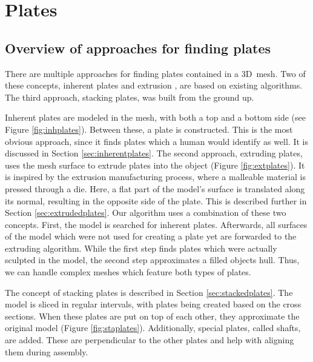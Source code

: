 \documentclass[../ClassicThesis.tex]{subfiles}
\begin{document}
\chapter{Plates}\label{ch:plates}

\section{Overview of approaches for finding plates}

There are multiple approaches for finding plates contained in a 3D~mesh. Two of these concepts, inherent plates \cite[p.~32]{master-thesis} and extrusion \cite[p.~28]{master-thesis}, are based on existing algorithms. The third approach, stacking plates, was built from the ground up.

Inherent plates are modeled in the mesh, with both a top and a bottom side (see Figure \ref{fig:inhplates}). Between these, a plate is constructed. This is the most obvious approach, since it finds plates which a human would identify as well. It is discussed in Section \ref{sec:inherentplates}. The second approach, extruding plates, uses the mesh surface to extrude plates into the object (Figure \ref{fig:extplates}). It is inspired by the extrusion manufacturing process, where a malleable material is pressed through a die. Here, a flat part of the model's surface is translated along its normal, resulting in the opposite side of the plate. This is described further in Section \ref{sec:extrudedplates}. Our algorithm uses a combination of these two concepts. First, the model is searched for inherent plates. Afterwards, all surfaces of the model which were not used for creating a plate yet are forwarded to the extruding algorithm. While the first step finds plates which were actually sculpted in the model, the second step approximates a filled objects hull. Thus, we can handle complex meshes which feature both types of plates. 

The concept of stacking plates is described in Section \ref{sec:stackedplates}. The model is sliced in regular intervals, with plates being created based on the cross sections. When these plates are put on top of each other, they approximate the original model (Figure \ref{fig:staplates}). Additionally, special plates, called shafts, are added. These are perpendicular to the other plates and help with aligning them during assembly.
\end{document}
